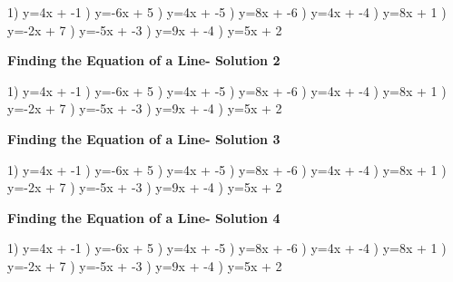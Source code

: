 \documentclass{article}%
\begin{document}
1) y=4x + -1%
) y=-6x + 5%
) y=4x + -5%
) y=8x + -6%
) y=4x + -4%
) y=8x + 1%
) y=-2x + 7%
) y=-5x + -3%
) y=9x + -4%
) y=5x + 2%
\newline%
\newpage%
\large%
\begin{center}%
\textbf{Finding the Equation of a Line- Solution 2}%
\newline%
\end{center} \normalsize%
1) y=4x + -1%
) y=-6x + 5%
) y=4x + -5%
) y=8x + -6%
) y=4x + -4%
) y=8x + 1%
) y=-2x + 7%
) y=-5x + -3%
) y=9x + -4%
) y=5x + 2%
\newline%
\newpage%
\large%
\begin{center}%
\textbf{Finding the Equation of a Line- Solution 3}%
\newline%
\end{center} \normalsize%
1) y=4x + -1%
) y=-6x + 5%
) y=4x + -5%
) y=8x + -6%
) y=4x + -4%
) y=8x + 1%
) y=-2x + 7%
) y=-5x + -3%
) y=9x + -4%
) y=5x + 2%
\newline%
\newpage%
\large%
\begin{center}%
\textbf{Finding the Equation of a Line- Solution 4}%
\newline%
\end{center} \normalsize%
1) y=4x + -1%
) y=-6x + 5%
) y=4x + -5%
) y=8x + -6%
) y=4x + -4%
) y=8x + 1%
) y=-2x + 7%
) y=-5x + -3%
) y=9x + -4%
) y=5x + 2%
\newline%
\newpage%
\end{document}

